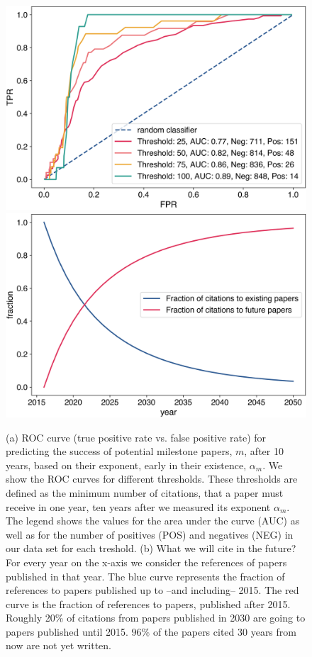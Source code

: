 \documentclass[fleqn,10pt]{wlscirep}
\begin{document}
\begin{figure}[H]
	\centering
	  \includegraphics[width=0.7\columnwidth]{6.png}
	  \includegraphics[width=0.7\columnwidth]{3.png}
		\caption{(a) ROC curve (true positive rate vs. false positive rate) for predicting the success of potential milestone papers, $m$, after 10 years, based on their exponent, early in their existence, $\alpha_m$. We show the ROC curves for different thresholds. These thresholds are defined as the minimum number of citations, that a paper must receive in one year, ten years after we measured its exponent $\alpha_m$. The legend shows the values for the area under the curve (AUC) as well as for the number of positives (POS) and negatives (NEG) in our data set for each treshold.
		(b) What we will cite in the future? For every year on the x-axis we consider the references of papers published in that year. The blue curve represents the fraction of references to papers published up to --and including-- 2015. The red curve is the fraction of references to papers, published after 2015. Roughly 20\% of citations from papers published in 2030 are going to papers published until 2015. $96\%$ of the papers cited 30 years from now are not yet written. 
		}
	\label{fig:roc}
\end{figure}
\end{document}
